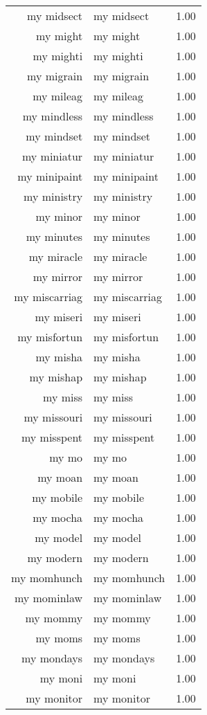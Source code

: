 \begin{table}[ht]
\begin{tabular}{rlr}
  my midsect & my midsect & 1.00 \\ 
  my might & my might & 1.00 \\ 
  my mighti & my mighti & 1.00 \\ 
  my migrain & my migrain & 1.00 \\ 
  my mileag & my mileag & 1.00 \\ 
  my mindless & my mindless & 1.00 \\ 
  my mindset & my mindset & 1.00 \\ 
  my miniatur & my miniatur & 1.00 \\ 
  my minipaint & my minipaint & 1.00 \\ 
  my ministry & my ministry & 1.00 \\ 
  my minor & my minor & 1.00 \\ 
  my minutes & my minutes & 1.00 \\ 
  my miracle & my miracle & 1.00 \\ 
  my mirror & my mirror & 1.00 \\ 
  my miscarriag & my miscarriag & 1.00 \\ 
  my miseri & my miseri & 1.00 \\ 
  my misfortun & my misfortun & 1.00 \\ 
  my misha & my misha & 1.00 \\ 
  my mishap & my mishap & 1.00 \\ 
  my miss & my miss & 1.00 \\ 
  my missouri & my missouri & 1.00 \\ 
  my misspent & my misspent & 1.00 \\ 
  my mo & my mo & 1.00 \\ 
  my moan & my moan & 1.00 \\ 
  my mobile & my mobile & 1.00 \\ 
  my mocha & my mocha & 1.00 \\ 
  my model & my model & 1.00 \\ 
  my modern & my modern & 1.00 \\ 
  my momhunch & my momhunch & 1.00 \\ 
  my mominlaw & my mominlaw & 1.00 \\ 
  my mommy & my mommy & 1.00 \\ 
  my moms & my moms & 1.00 \\ 
  my mondays & my mondays & 1.00 \\ 
  my moni & my moni & 1.00 \\ 
  my monitor & my monitor & 1.00 \\ 

\end{tabular}
\end{table}
